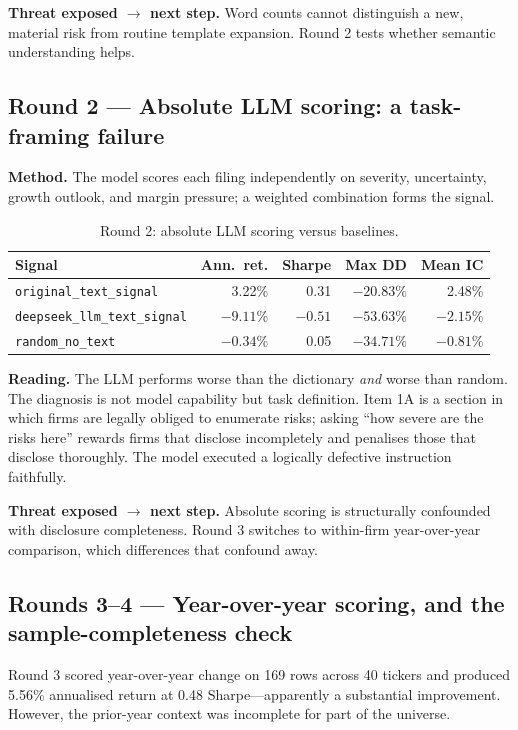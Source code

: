 \documentclass[11pt]{article}
\newcommand{\sig}[1]{\texttt{#1}}
\begin{document}
\textbf{Threat exposed $\rightarrow$ next step.} Word counts cannot distinguish a new,
material risk from routine template expansion. Round 2 tests whether semantic
understanding helps.

\subsection{Round 2 --- Absolute LLM scoring: a task-framing failure}

\textbf{Method.} The model scores each filing independently on severity, uncertainty,
growth outlook, and margin pressure; a weighted combination forms the signal.

\begin{table}[H]
\centering\small
\caption{Round 2: absolute LLM scoring versus baselines.}
\begin{tabular}{l r r r r}
\toprule
\textbf{Signal} & \textbf{Ann.\ ret.} & \textbf{Sharpe} & \textbf{Max DD} & \textbf{Mean IC} \\
\midrule
\sig{original\_text\_signal}      & 3.22\%    & 0.31  & $-20.83\%$ & 2.48\% \\
\sig{deepseek\_llm\_text\_signal} & $-9.11\%$ & $\mathbf{-0.51}$ & $-53.63\%$ & $-2.15\%$ \\
\sig{random\_no\_text}            & $-0.34\%$ & 0.05  & $-34.71\%$ & $-0.81\%$ \\
\bottomrule
\end{tabular}
\end{table}

\textbf{Reading.} The LLM performs worse than the dictionary \emph{and} worse than random.
The diagnosis is not model capability but task definition. Item 1A is a section in which
firms are legally obliged to enumerate risks; asking ``how severe are the risks here''
rewards firms that disclose incompletely and penalises those that disclose thoroughly. The
model executed a logically defective instruction faithfully.

\textbf{Threat exposed $\rightarrow$ next step.} Absolute scoring is structurally
confounded with disclosure completeness. Round 3 switches to within-firm year-over-year
comparison, which differences that confound away.

\subsection{Rounds 3--4 --- Year-over-year scoring, and the sample-completeness check}

Round 3 scored year-over-year change on 169 rows across 40 tickers and produced 5.56\%
annualised return at 0.48 Sharpe---apparently a substantial improvement. However, the
prior-year context was incomplete for part of the universe.
\end{document}
